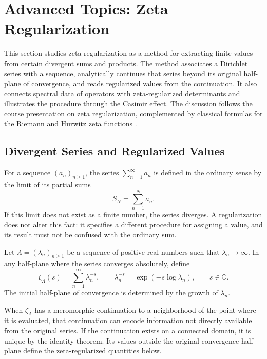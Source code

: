 \section{Advanced Topics: Zeta Regularization}

This section studies zeta regularization as a method for extracting finite values from certain divergent sums and products. The method associates a Dirichlet series with a sequence, analytically continues that series beyond its original half-plane of convergence, and reads regularized values from the continuation. It also connects spectral data of operators with zeta-regularized determinants and illustrates the procedure through the Casimir effect. The discussion follows the course presentation on zeta regularization, complemented by classical formulas for the Riemann and Hurwitz zeta functions \cite{SotoVillada2026ZR,Apostol1976-xj}.

\subsection{Divergent Series and Regularized Values}

For a sequence $(a_n)_{n\geq1}$, the series $\sum_{n=1}^{\infty}a_n$ is defined in the ordinary sense by the limit of its partial sums
\[
 S_N=\sum_{n=1}^{N}a_n.
\]
If this limit does not exist as a finite number, the series diverges. A regularization does not alter this fact: it specifies a different procedure for assigning a value, and its result must not be confused with the ordinary sum.

\begin{definition}
Let $\Lambda=(\lambda_n)_{n\geq1}$ be a sequence of positive real numbers such that $\lambda_n\to\infty$. In any half-plane where the series converges absolutely, define
\[
 \zeta_\Lambda(s)=\sum_{n=1}^{\infty}\lambda_n^{-s},
 \qquad \lambda_n^{-s}=\exp(-s\log\lambda_n),
 \qquad s\in\mathbb{C}.
\]
The initial half-plane of convergence is determined by the growth of $\lambda_n$.
\end{definition}

When $\zeta_\Lambda$ has a meromorphic continuation to a neighborhood of the point where it is evaluated, that continuation can encode information not directly available from the original series. If the continuation exists on a connected domain, it is unique by the identity theorem. Its values outside the original convergence half-plane define the zeta-regularized quantities below.

